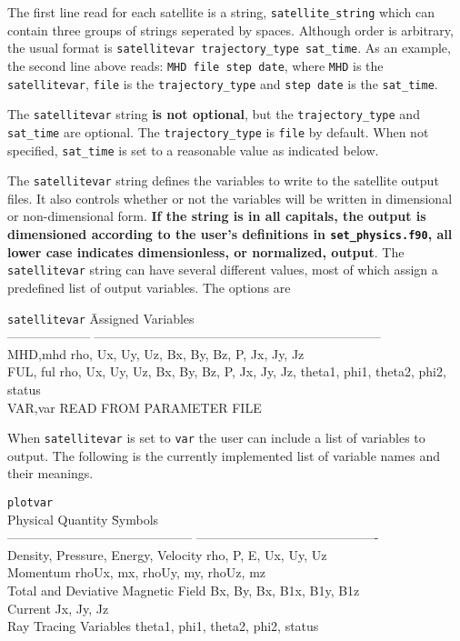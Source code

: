 The first line read for each satellite is a string, {\tt satellite\_string}
which can contain three groups of strings seperated by spaces.  Although order is
arbitrary, the usual format is {\tt  satellitevar trajectory\_type sat\_time}.  
As an example,  the second line above reads: {\tt MHD file step date}, where {\tt MHD}
is the {\tt satellitevar}, {\tt file} is the {\tt trajectory\_type} and 
{\tt step date} is the {\tt sat\_time}.

The {\tt satellitevar} string {\bf is not optional}, but the {\tt trajectory\_type}
and {\tt sat\_time} are optional. The {\tt trajectory\_type} is {\tt file} by default.
When not specified, {\tt sat\_time} is set to a reasonable value as indicated below.

The {\tt satellitevar} string defines the variables to write to the satellite output files.
It also controls whether or not the variables will be written in
dimensional or non-dimensional form.  {\bf If the string is in all capitals,
the output is dimensioned according to the user's definitions in 
{\tt set\_physics.f90},
all lower case indicates dimensionless, or normalized, output}. 
The {\tt satellitevar} string can have several different values, most of
which assign a predefined list of output variables. The options are
\begin{tabbing}
{\tt satellitevar}     \hspace{1.25in} \=  Assigned Variables \\
-------------------- \> -------------------------------------------------------------------- \\

MHD,mhd \> rho, Ux, Uy, Uz, Bx, By, Bz, P, Jx, Jy, Jz \\
FUL, ful \> rho, Ux, Uy, Uz, Bx, By, Bz, P, Jx, Jy, Jz, 
             theta1, phi1, theta2, phi2, status \\
VAR,var \> READ FROM PARAMETER FILE
\end{tabbing}

When {\tt satellitevar} is set to {\tt var} the user can include a list of
variables to output.  The following is the currently implemented list of
variable names and their meanings.
\begin{tabbing}
{\tt plotvar}\\
Physical Quantity                    \hspace{2.0in} \= Symbols \\
--------------------------------------------  \>
 ------------------------------------------- \\
Density, Pressure, Energy, Velocity   \> rho, P, E, Ux, Uy, Uz        \\
Momentum                              \> rhoUx, mx, rhoUy, my, rhoUz, mz \\
Total and Deviative Magnetic Field    \> Bx, By, Bx, B1x, B1y, B1z   \\
Current                               \> Jx, Jy, Jz \\
Ray Tracing Variables                 \> theta1, phi1, theta2, phi2, status \\
\end{tabbing}

